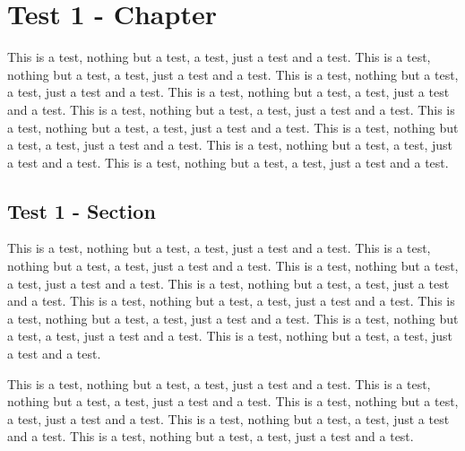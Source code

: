 \documentclass[12pt,twoside]{report}
\begin{document}
\listoftables

\listoffigures

\clearpage 


%
%
%
\chapter{Test 1 - Chapter}

This is a test, nothing but a test, a test, just a test and a test.
This is a test, nothing but a test, a test, just a test and a test.
This is a test, nothing but a test, a test, just a test and a test.
This is a test, nothing but a test, a test, just a test and a test.
This is a test, nothing but a test, a test, just a test and a test.
This is a test, nothing but a test, a test, just a test and a test.
This is a test, nothing but a test, a test, just a test and a test.
This is a test, nothing but a test, a test, just a test and a test.
This is a test, nothing but a test, a test, just a test and a test.

\section{Test 1 - Section}

This is a test, nothing but a test, a test, just a test and a test.
This is a test, nothing but a test, a test, just a test and a test.
This is a test, nothing but a test, a test, just a test and a test.
This is a test, nothing but a test, a test, just a test and a test.
This is a test, nothing but a test, a test, just a test and a test.
This is a test, nothing but a test, a test, just a test and a test.
This is a test, nothing but a test, a test, just a test and a test.
This is a test, nothing but a test, a test, just a test and a test.

This is a test, nothing but a test, a test, just a test and a test.
This is a test, nothing but a test, a test, just a test and a test.
This is a test, nothing but a test, a test, just a test and a test.
This is a test, nothing but a test, a test, just a test and a test.
This is a test, nothing but a test, a test, just a test and a test.
\end{document}

